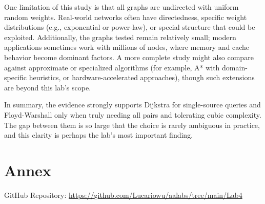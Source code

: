\documentclass{labreport}
\begin{document}
One limitation of this study is that all graphs are undirected with uniform random weights. Real-world networks often have directedness, specific weight distributions (e.g., exponential or power-law), or special structure that could be exploited. Additionally, the graphs tested remain relatively small; modern applications sometimes work with millions of nodes, where memory and cache behavior become dominant factors. A more complete study might also compare against approximate or specialized algorithms (for example, A* with domain-specific heuristics, or hardware-accelerated approaches), though such extensions are beyond this lab's scope.

In summary, the evidence strongly supports Dijkstra for single-source queries and Floyd-Warshall only when truly needing all pairs and tolerating cubic complexity. The gap between them is so large that the choice is rarely ambiguous in practice, and this clarity is perhaps the lab's most important finding.

\newpage

\section{Annex}

GitHub Repository: \url{https://github.com/Lucariowu/aalabs/tree/main/Lab4}
\end{document}
